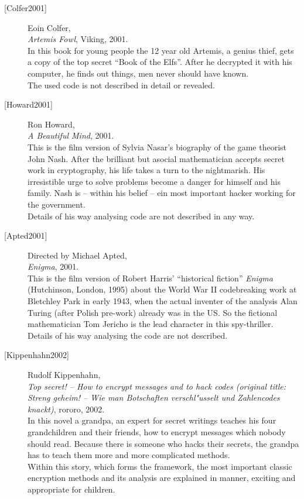 \begin{description}
\item[\textrm{[Colfer2001]}] 
    Eoin Colfer, \\
    {\em Artemis Fowl}, Viking, 2001. \\
    In this book for young people the 12 year old Artemis, a genius thief, gets
    a copy of the top secret ``Book of the Elfs''. After he decrypted it with
    his computer, he finds out things, men never should have known. \\
    The used code is not described in detail or revealed.


\item[\textrm{[Howard2001]}] 
    Ron Howard, \\
    {\em A Beautiful Mind}, 2001. \\
    This is the film version of Sylvia Nasar's biography of the game theorist
    John Nash. 
    After the brilliant but asocial mathematician accepts secret work in 
    cryptography, his life takes a turn to the nightmarish.
    His irresistible urge to solve problems become a danger for himself and
    his family. Nash is -- within his belief -- ein most important hacker working
    for the government.\\
    Details of his way analysing code are not described in any way.


\item[\textrm{[Apted2001]}] 
    Directed by Michael Apted, \\
    {\em Enigma}, 2001. \\
    This is the film version of Robert Harris' ``historical fiction'' 
    {\em Enigma} (Hutchinson, London, 1995) about the World War II 
    codebreaking work at Bletchley Park in early 1943, when the actual
    inventer of the analysis Alan Turing (after Polish pre-work) already 
    was in the US.
    So the fictional mathematician Tom Jericho is the lead character
    in this spy-thriller.\\
    Details of his way analysing the code are not described.


\item[\textrm{[Kippenhahn2002]}] 
    Rudolf Kippenhahn, \\
    {\em Top secret! -- How to encrypt messages and to hack codes (original
    title: Streng geheim! -- Wie man Botschaften verschl"usselt und 
    Zahlencodes knackt)}, rororo, 2002. \\
    In this novel a grandpa, an expert for secret writings teaches his
    four grandchildren and their friends, how to encrypt messages which
    nobody should read. Because there is someone who hacks their secrets,
    the grandpa has to teach them more and more complicated methods. \\
    Within this story, which forms the framework, the most important classic
    encryption methods and its analysis are explained in manner, exciting
    and appropriate for children.



\end{description}
